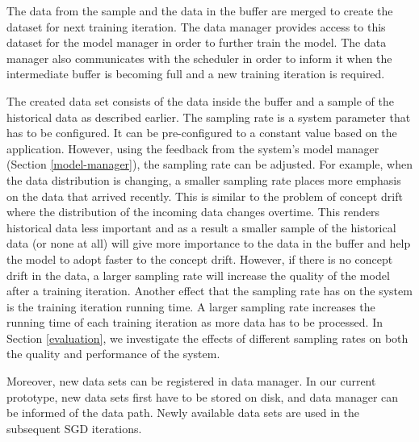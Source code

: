 \documentclass[10pt,conference,letterpaper]{IEEEtran}
\begin{document}
The data from the sample and the data in the buffer are merged to create the dataset for next training iteration.
The data manager provides access to this dataset for the model manager in order to further train the model.
The data manager also communicates with the scheduler in order to inform it when the intermediate buffer is becoming full and a new training iteration is required. 

The created data set consists of the data inside the buffer and a sample of the historical data as described earlier.
The sampling rate is a system parameter that has to be configured.
It can be pre-configured to a constant value based on the application.
However, using the feedback from the system's model manager (Section \ref{model-manager}), the sampling rate can be adjusted.
For example, when the data distribution is changing, a smaller sampling rate places more emphasis on the data that arrived recently. 
This is similar to the problem of concept drift where the distribution of the incoming data changes overtime.
This renders historical data less important and as a result a smaller sample of the historical data (or none at all) will give more importance to the data in the buffer and help the model to adopt faster to the concept drift.
However, if there is no concept drift in the data, a larger sampling rate will increase the quality of the model after a training iteration.
Another effect that the sampling rate has on the system is the training iteration running time.
A larger sampling rate increases the running time of each training iteration as more data has to be processed.
In Section \ref{evaluation}, we investigate the effects of different sampling rates on both the quality and performance of the system.

Moreover,  new data sets can be registered in data manager.
In our current prototype, new data sets first have to be stored on disk, and data manager can be informed of the data path.
Newly available data sets are used in the subsequent SGD iterations.

\end{document}
